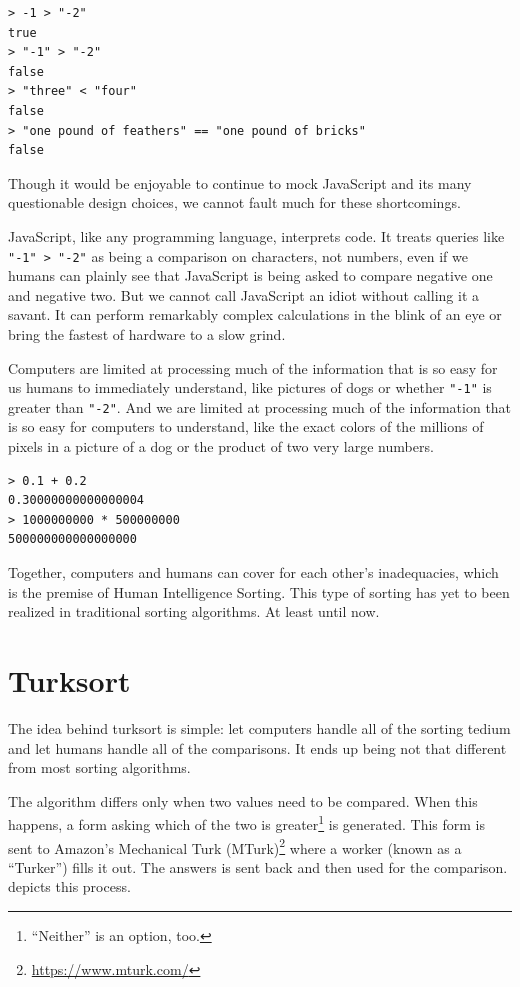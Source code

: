 \documentclass{article}
\begin{document}
\begin{lstlisting}[caption = Comparisons in JavaScript (Node.js 12.12.0)]
> -1 > "-2"
true
> "-1" > "-2"
false
> "three" < "four"
false
> "one pound of feathers" == "one pound of bricks"
false
\end{lstlisting}

Though it would be enjoyable to continue to mock JavaScript and its many
questionable design choices, we cannot fault much for these shortcomings.

JavaScript, like any programming language, interprets code. It treats queries
like \texttt{"-1" > "-2"} as being a comparison on characters, not numbers, even
if we humans can plainly see that JavaScript is being asked to compare negative
one and negative two. But we cannot call JavaScript an idiot without calling it
a savant. It can perform remarkably complex calculations in the blink of an eye
or bring the fastest of hardware to a slow grind.

Computers are limited at processing much of the information that is so easy for
us humans to immediately understand, like pictures of dogs or whether
\texttt{"-1"} is greater than \texttt{"-2"}. And we are limited at processing
much of the information that is so easy for computers to understand, like the
exact colors of the millions of pixels in a picture of a dog or the product of
two very large numbers.

\begin{lstlisting}[caption = Complex Operations in JavaScript (Node.js 12.12.0)]
> 0.1 + 0.2
0.30000000000000004
> 1000000000 * 500000000
500000000000000000
\end{lstlisting}

Together, computers and humans can cover for each other's inadequacies, which is
the premise of Human Intelligence Sorting. This type of sorting has yet to been
realized in traditional sorting algorithms. At least until now.

\section{Turksort}

The idea behind turksort is simple: let computers handle all of the sorting
tedium and let humans handle all of the comparisons. It ends up being not that
different from most sorting algorithms.

The algorithm differs only when two values need to be compared. When this
happens, a form asking which of the two is greater\footnote{``Neither'' is an
  option, too.} is generated. This form is sent to Amazon's Mechanical
Turk (MTurk)\footnote{\url{https://www.mturk.com/}} where a worker (known as a
``Turker'') fills it out. The answers is sent back and then used for the
comparison.  depicts this process.
\end{document}
